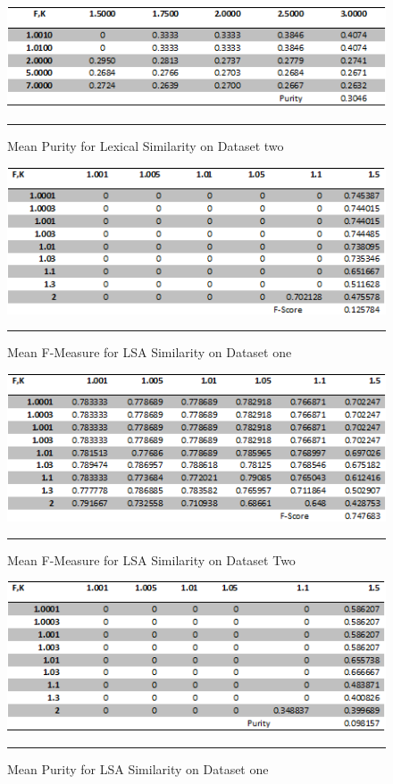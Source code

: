 \begin{figure}[htbp]
	\centering
		\includegraphics{./Figures/lexical_Purity_DS2.png}
		\rule{35em}{0.5pt}
	\caption[Mean Purity for Lexical Similarity on Dataset two]{Mean Purity for Lexical Similarity on Dataset two}
	\label{fig:purity4}
\end{figure}

\begin{figure}[htbp]
	\centering
		\includegraphics{./Figures/lsa_F_DS1.png}
		\rule{35em}{0.5pt}
	\caption[Mean F-Measure for LSA Similarity on Dataset one]{Mean F-Measure for LSA Similarity on Dataset one}
	\label{fig:F1}
\end{figure}

\begin{figure}[htbp]
	\centering
		\includegraphics{./Figures/lsa_F_DS2.png}
		\rule{35em}{0.5pt}
	\caption[Mean F-Measure for LSA Similarity on Dataset Two]{Mean F-Measure for LSA Similarity on Dataset Two}
	\label{fig:F2}
\end{figure}

\begin{figure}[htbp]
	\centering
		\includegraphics{./Figures/lsa_Purity_DS1.png}
		\rule{35em}{0.5pt}
	\caption[Mean Purity for LSA Similarity on Dataset one]{Mean Purity for LSA Similarity on Dataset one}
	\label{fig:F3}
\end{figure}

